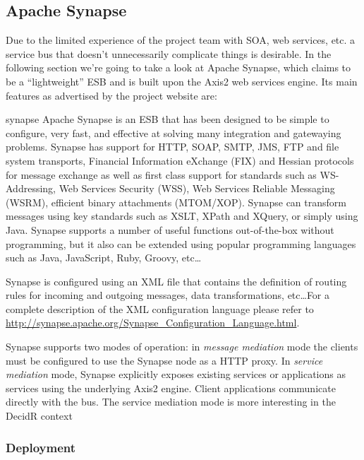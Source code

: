 \subsection{Apache Synapse}
\label{sec:apache-synapse}

Due to the limited experience of the project team with SOA, web services, etc.
a service bus that doesn't unnecessarily complicate things is desirable. In
the following section we're going to take a look at Apache Synapse, which
claims to be a ``lightweight'' ESB and is built upon the Axis2 web services
engine. Its main features as advertised by the project website are:

\begin{mycite}{synapse}
Apache Synapse is an ESB that has been designed to be simple to configure, very
fast, and effective at solving many integration and gatewaying problems. Synapse
has support for HTTP, SOAP, SMTP, JMS, FTP and file system transports, Financial
Information eXchange (FIX) and Hessian protocols for message exchange as well as
first class support for standards such as WS-Addressing, Web Services Security
(WSS), Web Services Reliable Messaging (WSRM), efficient binary attachments
(MTOM/XOP). Synapse can transform messages using key standards such as XSLT,
XPath and XQuery, or simply using Java. Synapse supports a number of useful
functions out-of-the-box without programming, but it also can be extended using
popular programming languages such as Java, JavaScript, Ruby, Groovy, etc\ldots
\end{mycite}

Synapse is configured using an XML file that contains the definition of routing
rules for incoming and outgoing messages, data transformations, etc\ldots For a
complete description of the XML configuration language please refer to 
\url{http://synapse.apache.org/Synapse_Configuration_Language.html}.

Synapse supports two modes of operation: in \emph{message mediation} mode
the clients must be configured to use the Synapse node as a HTTP proxy.
In \emph{service mediation} mode, Synapse explicitly exposes existing services
or applications as services using the underlying Axis2 engine. Client
applications communicate directly with the bus. The service mediation mode is
more interesting in the DecidR context 


\newpage
\subsubsection{Deployment}
\label{subsec:deployment}

